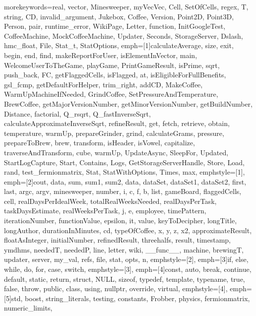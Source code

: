 {morekeywords={real, vector, Minesweeper, myVecVec, Cell, SetOfCells, regex, T, string, CD,
              invalid_argument, Jukebox, Coffee, Version, Point2D, Point3D, Person, pair,
              runtime_error, WikiPage, Letter, function, InitGoogleTest, CoffeeMachine,
              MockCoffeeMachine, Updater, Seconds, StorageServer, Dslash, hmc_float, File,
              Stat_t, StatOptions},
emph=[1]{calculateAverage, size, exit, begin, end, find, makeReportForUser, isElementInVector,
         main, WelcomeUserToTheGame, playGame, PrintGameResult, isPrime, sqrt, push_back, FC,
         getFlaggedCells, isFlagged, at, isEligibleForFullBenefits, gsl_fcmp, getDefaultForHelper,
         trim_right, addCD, MakeCoffee, WarmUpMachineIfNeeded, GrindCoffee, SetPressureAndTemperature,
         BrewCoffee, getMajorVersionNumber, getMinorVersionNumber, getBuildNumber, Distance, factorial,
         Q_rsqrt, Q_fastInverseSqrt, calculateApproximateInverseSqrt, refineResult, get, fetch, retrieve,
         obtain, temperature, warmUp, prepareGrinder, grind, calculateGrams, pressure, prepareToBrew, brew,
         transform, isHeader, isVowel, capitalize, traverseAndTransform, cube, warmUp, UpdateAsync, SleepFor,
         Updated, StartLogCapture, Start, Contains, Logs, GetStorageServerHandle, Store, Load, rand,
         test_fermionmatrix, Stat, StatWithOptions, Times, max},
emphstyle=[1]{\color{NavyBlue}}, %
emph=[2]{cout, data, sum, sum1, sum2, data, dataSet, dataSet1, dataSet2, first, last, argc, argv, minesweeper,
         number, i, c, f, b, list, gameBoard, flaggedCells, cell, realDaysPerIdealWeek, totalRealWeeksNeeded,
         realDaysPerTask, taskDaysEstimate, realWeeksPerTask, j, e, employee, timePattern, iterationNumber,
         functionValue, epsilon, it, value, keyToDecipher, longTitle, longAuthor, durationInMinutes, cd,
         typeOfCoffee, x, y, z, x2, approximateResult, floatAsInteger, initialNumber, refinedResult,
         threehalfs, result, timestamp, ymdhms, neededT, neededP, line, letter, wiki, __func__, machine,
         brewingT, updater, server, my_val, refs, file, stat, opts, n},
emphstyle=[2]{\color{Orange}}, %
emph=[3]{if, else, while, do, for, case, switch},
emphstyle=[3]{\color{violet}}, %
emph=[4]{const, auto, break, continue, default, static, return, struct, NULL, sizeof, typedef,
         template, typename, true, false, throw, public, class, using, nullptr, override, virtual},
emphstyle=[4]{\color{ProcessBlue}}, %
emph=[5]{std, boost, string_literals, testing, constants, Frobber, physics, fermionmatrix, numeric_limits},
}
